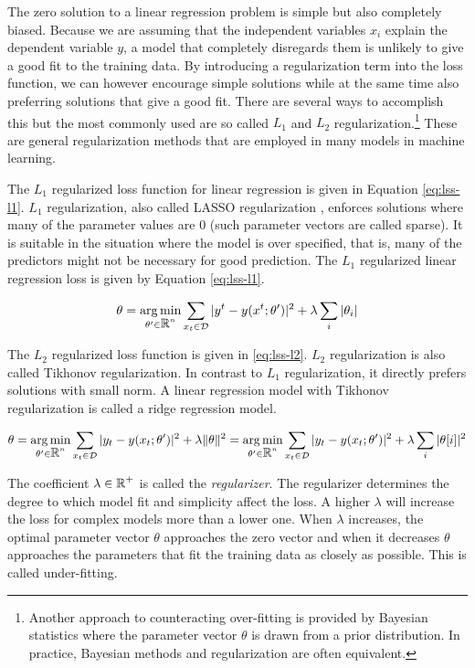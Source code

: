 The zero solution to a linear regression problem is simple but also
completely biased. Because we are assuming that the independent
variables $x_i$ explain the dependent variable $y$, a model that
completely disregards them is unlikely to give a good fit to the
training data. By introducing a regularization term into the loss
function, we can however encourage simple solutions while at the same
time also preferring solutions that give a good fit. There are several
ways to accomplish this but the most commonly used are so called $L_1$
and $L_2$ regularization.\footnote{Another approach to counteracting
  over-fitting is provided by Bayesian statistics where the parameter
  vector $\theta$ is drawn from a prior distribution. In practice,
  Bayesian methods and regularization are often equivalent.} These are
general regularization methods that are employed in many models in
machine learning.

The $L_1$ regularized loss function for linear regression is given in
Equation \ref{eq:lss-l1}. $L_1$ regularization, also called LASSO
regularization \cite{Tibshirani1996}, enforces solutions where many of
the parameter values are $0$ (such parameter vectors are called
sparse). It is suitable in the situation where the model is over
specified, that is, many of the predictors might not be necessary for
good prediction. The $L_1$ regularized linear regression loss is given
by Equation \ref{eq:lss-l1}.

\begin{equation}
\theta = \operatorname*{arg\,min}_{\theta' \in \mbox{$\mathbb R$}^n} \sum_{x_t \in \mathcal{D}} | y^t - y(x^t\mbox{$ ; \, $} \theta')|^2 + \lambda \sum_i |\theta_i|\label{eq:lss-l1}
\end{equation}

The $L_2$ regularized loss function is given in \ref{eq:lss-l2}. $L_2$
regularization is also called Tikhonov regularization. In contrast to
$L_1$ regularization, it directly prefers solutions with small norm. A
linear regression model with Tikhonov regularization is called a ridge
regression model.

\begin{equation}
\theta = \operatorname*{arg\,min}_{\theta' \in \mbox{$\mathbb R$}^n} \sum_{x_t \in \mathcal{D}} | y_t - y(x_t\mbox{$ ; \, $} \theta')|^2 + \lambda \|\theta\|^2 = \operatorname*{arg\,min}_{\theta' \in \mbox{$\mathbb R$}^n} \sum_{x_t \in \mathcal{D}} | y_t - y(x_t\mbox{$ ; \, $} \theta')|^2 + \lambda \sum_i |\theta[i]|^2\label{eq:lss-l2}
\end{equation}

The coefficient $\lambda \in \mbox{$\mathbb R$}^+$ is called the {\it
  regularizer}. The regularizer determines the degree to which model
fit and simplicity affect the loss. A higher $\lambda$ will increase
the loss for complex models more than a lower one. When $\lambda$
increases, the optimal parameter vector $\theta$ approaches the zero
vector and when it decreases $\theta$ approaches the parameters that
fit the training data as closely as possible. This is called
under-fitting.

